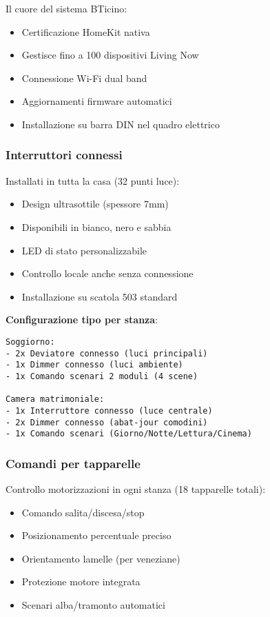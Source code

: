 Il cuore del sistema BTicino:
\begin{itemize}
    \item Certificazione HomeKit nativa
    \item Gestisce fino a 100 dispositivi Living Now
    \item Connessione Wi-Fi dual band
    \item Aggiornamenti firmware automatici
    \item Installazione su barra DIN nel quadro elettrico
\end{itemize}

\subsubsection{Interruttori connessi}

Installati in tutta la casa (32 punti luce):
\begin{itemize}
    \item Design ultrasottile (spessore 7mm)
    \item Disponibili in bianco, nero e sabbia
    \item LED di stato personalizzabile
    \item Controllo locale anche senza connessione
    \item Installazione su scatola 503 standard
\end{itemize}

\textbf{Configurazione tipo per stanza}:
\begin{verbatim}
Soggiorno:
- 2x Deviatore connesso (luci principali)
- 1x Dimmer connesso (luci ambiente)
- 1x Comando scenari 2 moduli (4 scene)

Camera matrimoniale:
- 1x Interruttore connesso (luce centrale)
- 2x Dimmer connesso (abat-jour comodini)
- 1x Comando scenari (Giorno/Notte/Lettura/Cinema)
\end{verbatim}

\subsubsection{Comandi per tapparelle}

Controllo motorizzazioni in ogni stanza (18 tapparelle totali):
\begin{itemize}
    \item Comando salita/discesa/stop
    \item Posizionamento percentuale preciso
    \item Orientamento lamelle (per veneziane)
    \item Protezione motore integrata
    \item Scenari alba/tramonto automatici
\end{itemize}

